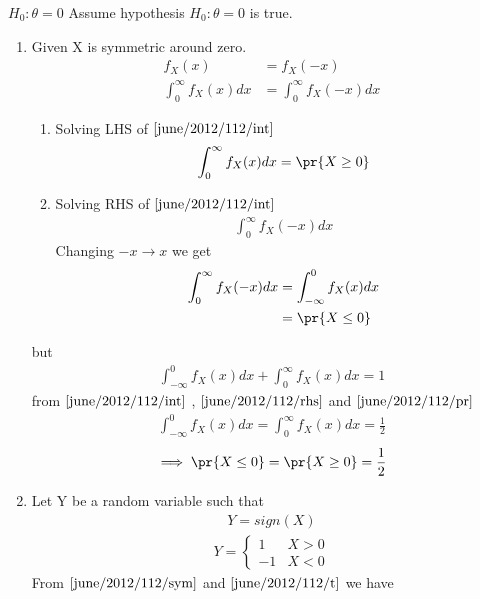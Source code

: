 {$H_0:\theta=0$}
Assume hypothesis
$H_0:\theta=0$ is true.
\begin{enumerate}
\item Given X is symmetric around zero.
 \begin{align}
  f_X(x)&=f_X(-x)\\
  \int_{0}^{\infty}f_X(x)dx&=\int_{0}^{\infty}f_X(-x)dx
  \label{june/2012/112/int}
\end{align}
\begin{enumerate}
\item Solving LHS of $\eqref{june/2012/112/int}$
\begin{align}
    \int_{0}^{\infty}f_X(x)dx=\pr{X\geq0}
\end{align}
\item Solving RHS of $\eqref{june/2012/112/int}$
\begin{align}
    \int_{0}^{\infty}f_X(-x)dx
\end{align}
Changing $-x \rightarrow x$ we get 
\begin{align}
  \int_{0}^{\infty}f_X(-x)dx&=\int_{-\infty}^{0}f_X(x)dx\label{june/2012/112/rhs}\\
  &=\pr{X\leq0}
\end{align}
\end{enumerate}
but
\begin{align}
  \int_{-\infty}^{0}f_X(x)dx+\int_{0}^{\infty}f_X(x)dx=1
  \label{june/2012/112/pr}
\end{align}
from $\eqref{june/2012/112/int}$ , $\eqref{june/2012/112/rhs}$ and $\eqref{june/2012/112/pr}$
\begin{align}
\int_{-\infty}^{0}f_X(x)dx=\int_{0}^{\infty}f_X(x)dx=\frac{1}{2}
\end{align}
\begin{align}
    \implies \pr{X\leq 0}=\pr{X\geq0}=\frac{1}{2}
    \label{june/2012/112/sym}
\end{align}
\item Let Y be a random variable such that
\begin{align}
    Y=sign(X)
\end{align}
\begin{align}
    Y=
    \begin{cases}
     1 & X>0\\
    -1 & X<0
    \end{cases}
    \label{june/2012/112/t}
\end{align}
From $\eqref{june/2012/112/sym}$ and $\eqref{june/2012/112/t}$
we have
\begin{align}

\end{align}
\end{enumerate}
